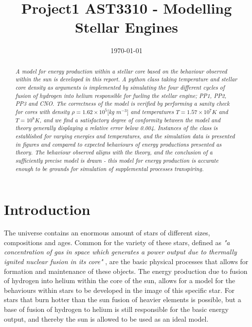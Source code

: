 \documentclass[10pt, nofootinbib, twocolumn]{revtex4-1}
\begin{document}
\vspace*{2\baselineskip}
\title{Project1 AST3310 - Modelling Stellar Engines} 
\vspace*{3\baselineskip}
\date{\today}        
\begin{abstract}
\vspace*{1\baselineskip}
\textit{
A model for energy production within a stellar core based on the behaviour observed within the sun is developed in this report. A python class taking temperature and stellar core density as arguments is implemented by simulating the four different cycles of fusion of hydrogen into helium responsible for fueling the stellar engine; PP1, PP2, PP3 and CNO. The correctness of the model is verified by performing a sanity check for cores with density $\rho=1.62\times 10^5 [$kg $m^{-3}]$ and temperatures $T= 1.57\times 10^7 K$ and $T= 10^8 K$, and we find a satisfactory degree of conformity between the model and theory generally displaying a relative error below 0.004. Instances of the class is established for varying energies and temperatures, and the simulation data is presented in figures and compared to expected behaviours of energy productions presented as theory. The behaviour observed aligns with the theory, and the conclusion of a sufficiently precise model is drawn - this model for energy production is accurate enough to be grounds for simulation of supplemental processes transpiring.
}
\end{abstract}
\maketitle       

\section{Introduction}\label{sec:introduction}
The universe contains an enormous amount of stars of different sizes, compositions and ages. Common for the variety of these stars, defined as \textit{"a concentration of gas in space which generates a power output due to thermally ignited nuclear fusion in its core"} \cite{ast}, are the basic physical processes that allows for formation and maintenance of these objects. The energy production due to fusion of hydrogen into helium within the core of the sun, allows for a model for the behaviours within stars to be developed in the image of this specific star. For stars that burn hotter than the sun fusion of heavier elements is possible, but a base of fusion of hydrogen to helium is still responsible for the basic energy output, and thereby the sun is allowed to be used as an ideal model. \\
\end{document}
